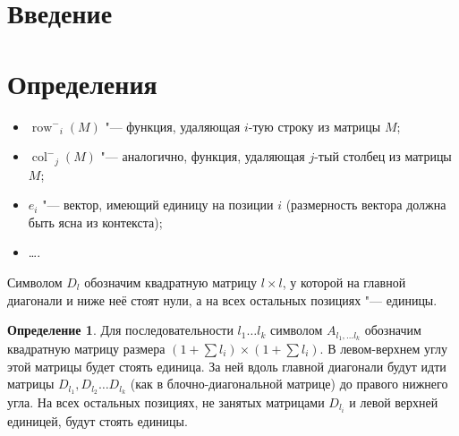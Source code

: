 \documentclass[oneside, a4paper]{article}
\theoremstyle{definition}
\newtheorem{definition}{Определение}
\theoremstyle{remark}
\newcommand\rowm{\ensuremath{\operatorname{row}^-}}
\newcommand\colm{\ensuremath{\operatorname{col}^-}}
\begin{document}
\title{}
\author{Олейников Иван}
\date{\today}
\maketitle

% 
% 

\tableofcontents

\section{Введение}



\section{Определения}

\begin{itemize}
\item $\rowm_i(M)$ "--- функция, удаляющая $i$-тую строку из матрицы $M$;
\item $\colm_j(M)$ "--- аналогично, функция, удаляющая $j$-тый столбец из матрицы $M$;
\item $e_i$ "--- вектор, имеющий единицу на позиции $i$ (размерность вектора
должна быть ясна из контекста);
\item \dots.
\end{itemize}

Символом $D_l$ обозначим квадратную матрицу $l \times l$, у которой на главной
диагонали и ниже неё стоят нули, а на всех остальных позициях "--- единицы.

\begin{definition}
Для последовательности $l_1 \dots l_k$ символом $A_{l_1, \dots l_k}$ обозначим
квадратную матрицу размера $(1 + \sum l_i) \times (1 + \sum l_i)$. В левом-верхнем
углу этой матрицы будет стоять единица. За ней вдоль главной диагонали будут идти
матрицы $D_{l_1}, D_{l_2} \dots D_{l_k}$ (как в блочно-диагональной матрице) до
правого нижнего угла. На всех остальных позициях, не занятых матрицами $D_{l_i}$
и левой верхней единицей, будут стоять единицы.
\end{definition}
\end{document}
